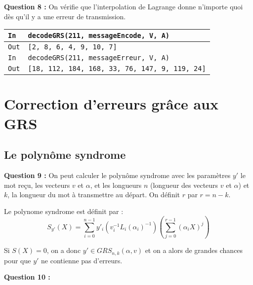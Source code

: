 \documentclass[titlepage]{article}
\begin{document}
        \textbf{Question 8 :}
        On vérifie que l'interpolation de Lagrange donne n'importe quoi dès qu'il y a une erreur de transmission.

        \begin{tabularx}{12cm}{|p{0.60cm}|X|}
            \hline
            \rowcolor{gray}
            \texttt{In}
            & 
            \texttt{decodeGRS(211, messageEncode, V, A)}
            \\
            \hline
            \texttt{Out}
            &
            \texttt{[2, 8, 6, 4, 9, 10, 7]}
            \\
            \hline
            \rowcolor{gray}
            \texttt{In}
            & 
            \texttt{decodeGRS(211, messageErreur, V, A)}
            \\
            \hline
            \texttt{Out}
            &
            \texttt{[18, 112, 184, 168, 33, 76, 147, 9, 119, 24]}
            \\
            \hline
        \end{tabularx}
        \bigbreak

    \section{Correction d’erreurs grâce aux GRS}
        \subsection{Le polynôme syndrome}
        \textbf{Question 9 :}
        On peut calculer le polynôme syndrome avec les paramètres $y'$ le mot reçu, les vecteurs $v$ et $\alpha$, 
        et les longueurs $n$ (longueur des vecteurs $v$ et $\alpha$) et $k$, la longueur du mot à transmettre au départ. 
        On définit $r$ par $r = n - k$.

        Le polynome syndrome est définit par : 
        \[S_{y'}(X) = \sum_{i = 0}^{n - 1}y'_i(v_i^{-1}L_i(\alpha_i)^{-1})(\sum_{j = 0}^{r - 1}(\alpha_iX)^j)\]

        Si $S(X) = 0$, on a donc $y' \in GRS_{n,k}(\alpha,v)$ et on a alors de grandes chances pour que $y'$ ne contienne pas d'erreurs.

        

        \textbf{Question 10 :}\bigbreak
\end{document}
